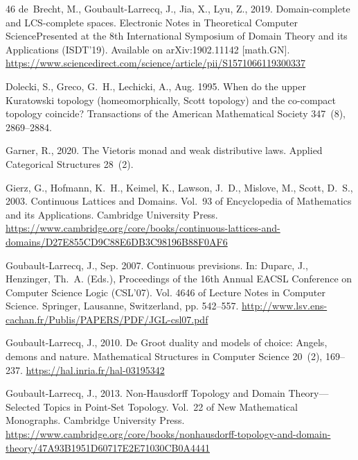 \documentclass[preprint,12pt]{elsarticle}
\begin{document}
\begin{thebibliography}{46}
de~Brecht, M., Goubault{-}Larrecq, J., Jia, X., Lyu, Z., 2019. Domain-complete
  and {LCS}-complete spaces. Electronic Notes in Theoretical Computer
  SciencePresented at the 8th International Symposium of Domain Theory and its
  Applications (ISDT'19). Available on arXiv:1902.11142 [math.GN].
\newline\urlprefix\url{https://www.sciencedirect.com/science/article/pii/S1571066119300337}

Dolecki, S., Greco, G.~H., Lechicki, A., Aug. 1995. When do the upper
  {K}uratowski topology (homeomorphically, {S}cott topology) and the co-compact
  topology coincide? Transactions of the American Mathematical Society 347~(8),
  2869--2884.

Garner, R., 2020. The {V}ietoris monad and weak distributive laws. Applied
  Categorical Structures 28~(2).

Gierz, G., Hofmann, K.~H., Keimel, K., Lawson, J.~D., Mislove, M., Scott,
  D.~S., 2003. Continuous Lattices and Domains. Vol.~93 of Encyclopedia of
  Mathematics and its Applications. Cambridge University Press.
\newline\urlprefix\url{https://www.cambridge.org/core/books/continuous-lattices-and-domains/D27E855CD9C88E6DB3C98196B88F0AF6}

Goubault{-}Larrecq, J., Sep. 2007. Continuous previsions. In: Duparc, J.,
  Henzinger, {\relax Th}.~A. (Eds.), {P}roceedings of the 16th {A}nnual {EACSL}
  {C}onference on {C}omputer {S}cience {L}ogic ({CSL}'07). Vol. 4646 of Lecture
  Notes in Computer Science. Springer, Lausanne, Switzerland, pp. 542--557.
\newline\urlprefix\url{http://www.lsv.ens-cachan.fr/Publis/PAPERS/PDF/JGL-csl07.pdf}

Goubault-Larrecq, J., 2010. {D}e {G}root duality and models of choice: Angels,
  demons and nature. Mathematical Structures in Computer Science 20~(2),
  169--237.
\newline\urlprefix\url{https://hal.inria.fr/hal-03195342}

Goubault{-}Larrecq, J., 2013. Non-{H}ausdorff Topology and Domain
  Theory---Selected Topics in Point-Set Topology. Vol.~22 of New Mathematical
  Monographs. Cambridge University Press.
\newline\urlprefix\url{https://www.cambridge.org/core/books/nonhausdorff-topology-and-domain-theory/47A93B1951D60717E2E71030CB0A4441}


\end{thebibliography}
\end{document}
